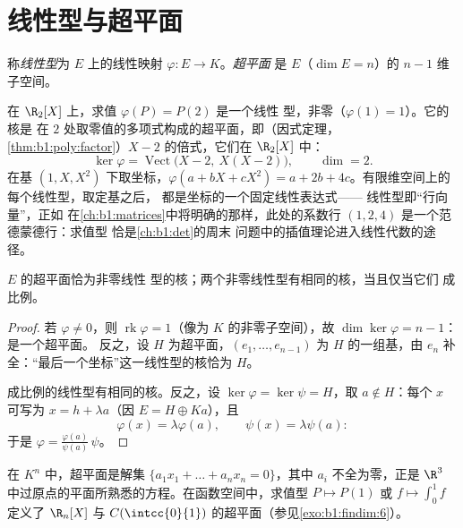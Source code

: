 \section{线性型与超平面}

\begin{definition}\label{def:b1:linmaps:forms}
称\emph{线性型}为 $E$ 上的线性映射
$\varphi \colon E \to K$。\emph{超平面}
是 $E$（$\dim E = n$）的 $n - 1$ 维子空间。
\end{definition}

\begin{example}[求值型及其超平面]
\label{ex:b1:linmaps:evaluationform}
在 $\R_2[X]$ 上，求值 $\varphi(P) = P(2)$ 是一个线性
型，非零（$\varphi(1) = 1$）。它的核是
在 $2$ 处取零值的多项式构成的超平面，即（因式定理，
\cref{thm:b1:poly:factor}）$X - 2$ 的倍式，它们在
$\R_2[X]$ 中：
\[
\ker\varphi = \operatorname{Vect}\bigl(X - 2,\ X(X - 2)\bigr),
\qquad \dim = 2 .
\]
在基 $(1, X, X^2)$ 下取坐标，$\varphi(a + bX + cX^2) = a +
2b + 4c$。有限维空间上的每个线性型，取定基之后，
都是坐标的一个固定线性表达式——
线性型即“行向量”，正如
在\cref{ch:b1:matrices}中将明确的那样，此处的系数行
$(1, 2, 4)$ 是一个范德蒙德行：求值型
恰是\cref{ch:b1:det}的周末
问题中的插值理论进入线性代数的途径。
\end{example}

\begin{theorem}\label{thm:b1:linmaps:hyperplanes}
$E$ 的超平面恰为非零线性
型的核；两个非零线性型有相同的核，当且仅当它们
成比例。
\end{theorem}

\begin{proof}
若 $\varphi \neq 0$，则 $\operatorname{rk}\varphi = 1$（像为
$K$ 的非零子空间），故 $\dim\ker\varphi = n - 1$：是一个超平面。
反之，设 $H$ 为超平面，$(e_1, \dots, e_{n-1})$ 为
$H$ 的一组基，由 $e_n$ 补全：“最后一个坐标”这一线性型的核恰为
$H$。

成比例的线性型有相同的核。反之，设
$\ker\varphi = \ker\psi = H$，取 $a \notin H$：每个 $x$ 可写为
$x = h + \lambda a$（因 $E = H \oplus Ka$），且
\[
\varphi(x) = \lambda \varphi(a), \qquad \psi(x) = \lambda\psi(a):
\]
于是 $\varphi = \frac{\varphi(a)}{\psi(a)}\,\psi$。
\end{proof}

\begin{example}\label{ex:b1:linmaps:hyperplane}
在 $K^n$ 中，超平面是解集 $\{a_1 x_1 + \dots + a_n
x_n = 0\}$，其中 $a_i$ 不全为零，正是
$\R^3$ 中过原点的平面所熟悉的方程。在函数空间中，求值型
$P \mapsto P(1)$ 或 $f \mapsto \int_0^1 f$ 定义了
$\R_n[X]$ 与 $C(\intcc{0}{1})$ 的超平面（参见\cref{exo:b1:findim:6}）。
\end{example}

